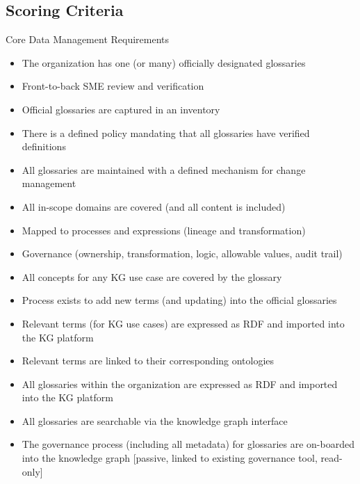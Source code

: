 \subsection*{Scoring Criteria}

Core Data Management Requirements
\begin{itemize}
  \item The organization has one (or many) officially designated glossaries
  \item Front-to-back SME review and verification
  \item Official glossaries are captured in an inventory
  \item There is a defined policy mandating that all glossaries have verified definitions
  \item All glossaries are maintained with a defined mechanism for change management
  \item All in-scope domains are covered (and all content is included)
  \item Mapped to processes and expressions (lineage and transformation)
  \item Governance (ownership, transformation, logic, allowable values, audit trail)
\end{itemize}

\kgmmscoringlevelOne

\begin{itemize}
  \item All concepts for any KG use case are covered by the glossary
  \item Process exists to add new terms (and updating) into the official glossaries
\end{itemize}

\kgmmscoringlevelTwo

\begin{itemize}
  \item Relevant terms (for KG use cases) are expressed as RDF and imported into the KG platform
  \item Relevant terms  are linked to their corresponding ontologies
\end{itemize}

\kgmmscoringlevelThree

\begin{itemize}
  \item All glossaries within the organization are expressed as RDF and imported into the KG platform
  \item All glossaries are searchable via the knowledge graph interface
  \item The governance process (including all metadata) for glossaries are on-boarded into the knowledge graph [passive, linked to existing governance tool, read-only]
\end{itemize}

